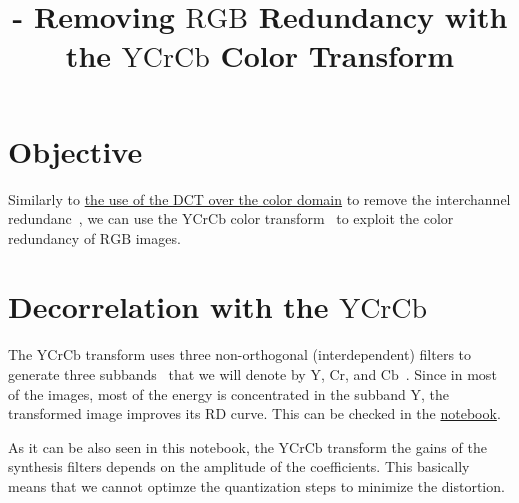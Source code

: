 
 \title{\SM{} - Removing $\text{RGB}$ Redundancy with the $\text{YCrCb}$ Color Transform}

\maketitle
\tableofcontents

\section{Objective}
Similarly to
\href{https://sistemas-multimedia.github.io/contents/RGB_DCT_SQ/}{the
  use of the DCT over the color domain} to remove the interchannel
redundanc~\cite{vruiz__visual_redundancy}, we can use the
\href{https://en.wikipedia.org/wiki/YCbCr}{$\text{YCrCb}$} color
transform~\cite{vruiz__transform_coding,vruiz__YCrCb} to exploit the color redundancy of $\text{RGB}$ images.

\section{Decorrelation with the $\text{YCrCb}$}
The $\text{YCrCb}$ transform uses three non-orthogonal
(interdependent) filters to generate three
subbands~\cite{vruiz__transform_coding} that we will denote by
$\text{Y}$, $\text{Cr}$, and $\text{Cb}$~\cite{vruiz__YCrCb}. Since in
most of the images, most of the energy is concentrated in the subband
$\text{Y}$, the transformed image improves its RD curve. This can be
checked in the
\href{https://github.com/Sistemas-Multimedia/Sistemas-Multimedia.github.io/blob/master/contents/YCrCb_SQ/YCrCb_SQ.ipynb}{notebook}.

As it can be also seen in this notebook, the  $\text{YCrCb}$ transform the gains of the synthesis filters depends on the amplitude of the coefficients. This basically means that we cannot optimze the quantization steps to minimize the distortion.

